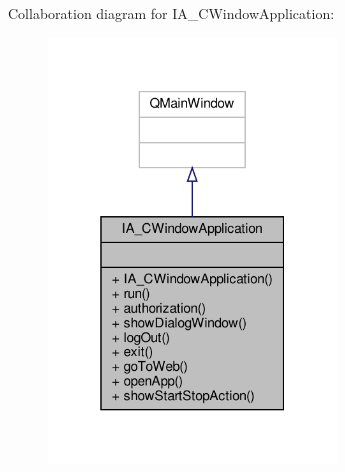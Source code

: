 Collaboration diagram for I\+A\+\_\+\+C\+Window\+Application\+:
\nopagebreak
\begin{figure}[H]
\begin{center}
\leavevmode
\includegraphics[width=217pt]{classIA__CWindowApplication__coll__graph}
\end{center}
\end{figure}
